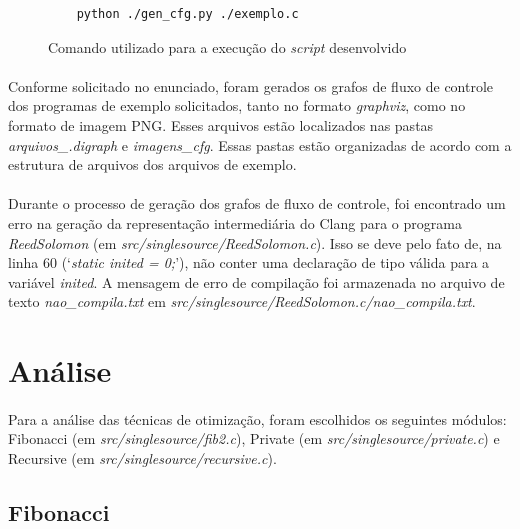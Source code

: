 \documentclass[12pt]{article}
\begin{document}
\begin{figure}
    \centering
    \begin{verbatim}
    python ./gen_cfg.py ./exemplo.c
\end{verbatim}
    \caption{Comando utilizado para a execução do \textit{script} desenvolvido}
\end{figure}

\paragraph{}Conforme solicitado no enunciado, foram gerados os grafos de fluxo de controle dos programas de exemplo solicitados, tanto no formato \textit{graphviz}, como no formato de imagem PNG. Esses arquivos estão localizados nas pastas \textit{arquivos\_.digraph} e \textit{imagens\_cfg}. Essas pastas estão organizadas de acordo com a estrutura de arquivos dos arquivos de exemplo.

\paragraph{}Durante o processo de geração dos grafos de fluxo de controle, foi encontrado um erro na geração da representação intermediária do Clang para o programa \textit{ReedSolomon} (em \textit{src/singlesource/ReedSolomon.c}). Isso se deve pelo fato de, na linha 60 (‘\textit{static inited = 0;}’), não conter uma declaração de tipo válida para a variável \textit{inited}. A mensagem de erro de compilação foi armazenada no arquivo de texto \textit{nao\_compila.txt} em \textit{src/singlesource/ReedSolomon.c/nao\_compila.txt}.

\FloatBarrier

\section{Análise}

\paragraph{}Para a análise das técnicas de otimização, foram escolhidos os seguintes módulos: Fibonacci (em \textit{src/singlesource/fib2.c}), Private (em \textit{src/singlesource/private.c}) e Recursive (em \textit{src/singlesource/recursive.c}).

\subsection{Fibonacci}
\end{document}
